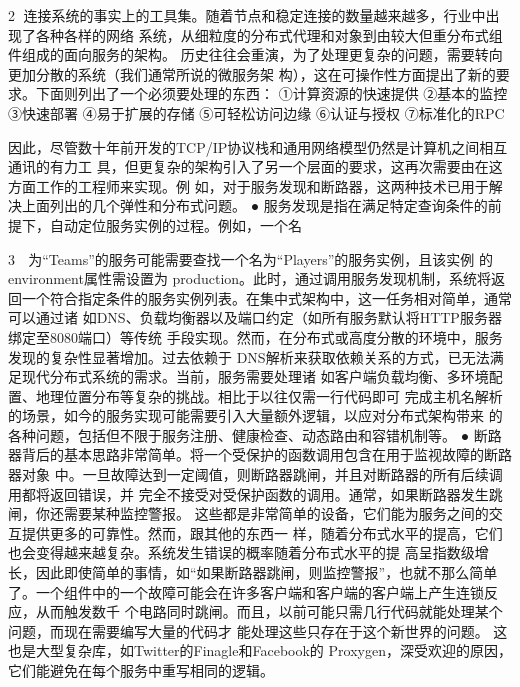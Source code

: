                                             2
连接系统的事实上的工具集。随着节点和稳定连接的数量越来越多，行业中出现了各种各样的网络
系统，从细粒度的分布式代理和对象到由较大但重分布式组件组成的面向服务的架构。
历史往往会重演，为了处理更复杂的问题，需要转向更加分散的系统（我们通常所说的微服务架
构），这在可操作性方面提出了新的要求。下面则列出了一个必须要处理的东西：
①计算资源的快速提供
②基本的监控
③快速部署
④易于扩展的存储
⑤可轻松访问边缘
⑥认证与授权
⑦标准化的RPC




因此，尽管数十年前开发的TCP/IP协议栈和通用网络模型仍然是计算机之间相互通讯的有力工
具，但更复杂的架构引入了另一个层面的要求，这再次需要由在这方面工作的工程师来实现。例
如，对于服务发现和断路器，这两种技术已用于解决上面列出的几个弹性和分布式问题。
 ● 服务发现是指在满足特定查询条件的前提下，自动定位服务实例的过程。例如，一个名


                                               3
    为“Teams”的服务可能需要查找一个名为“Players”的服务实例，且该实例
    的 environment﻿属性需设置为 ﻿production﻿。此时，通过调用服务发现机制，系统将返
    回一个符合指定条件的服务实例列表。在集中式架构中，这一任务相对简单，通常可以通过诸
    如DNS、负载均衡器以及端口约定（如所有服务默认将HTTP服务器绑定至8080端口）等传统
    手段实现。然而，在分布式或高度分散的环境中，服务发现的复杂性显著增加。过去依赖于
    DNS解析来获取依赖关系的方式，已无法满足现代分布式系统的需求。当前，服务需要处理诸
    如客户端负载均衡、多环境配置、地理位置分布等复杂的挑战。相比于以往仅需一行代码即可
    完成主机名解析的场景，如今的服务实现可能需要引入大量额外逻辑，以应对分布式架构带来
    的各种问题，包括但不限于服务注册、健康检查、动态路由和容错机制等。
 ● 断路器背后的基本思路非常简单。将一个受保护的函数调用包含在用于监视故障的断路器对象
    中。一旦故障达到一定阈值，则断路器跳闸，并且对断路器的所有后续调用都将返回错误，并
    完全不接受对受保护函数的调用。通常，如果断路器发生跳闸，你还需要某种监控警报。
这些都是非常简单的设备，它们能为服务之间的交互提供更多的可靠性。然而，跟其他的东西一
样，随着分布式水平的提高，它们也会变得越来越复杂。系统发生错误的概率随着分布式水平的提
高呈指数级增长，因此即使简单的事情，如“如果断路器跳闸，则监控警报”，也就不那么简单
了。一个组件中的一个故障可能会在许多客户端和客户端的客户端上产生连锁反应，从而触发数千
个电路同时跳闸。而且，以前可能只需几行代码就能处理某个问题，而现在需要编写大量的代码才
能处理这些只存在于这个新世界的问题。 这也是大型复杂库，如Twitter的Finagle和Facebook的
Proxygen，深受欢迎的原因，它们能避免在每个服务中重写相同的逻辑。




